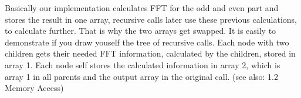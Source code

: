 Basically our implementation calculates FFT for the odd and even part and stores the result in one array, recursive calls later use these previous calculations, to calculate further. That is why the two arrays get swapped. It is easily to demonstrate if you draw youself the tree of recursive calls. Each node with two children gets their needed FFT information, calculated by the children, stored in array 1. Each node self stores the calculated information in array 2, which
is array 1 in all parents and the output array in the original call. (see also: 1.2 Memory Access)
